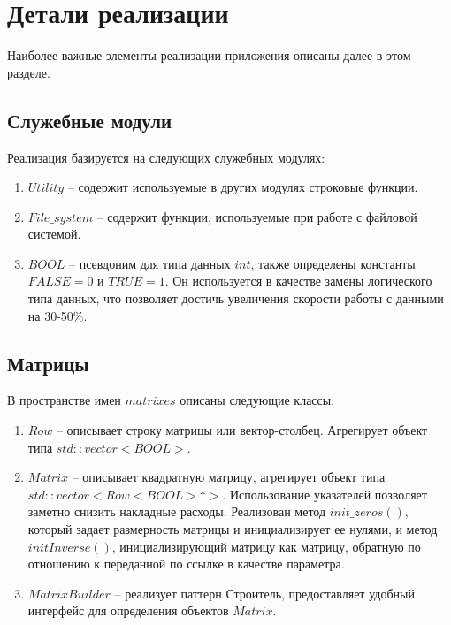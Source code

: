 
	
\section{Детали реализации} \label{ch2:sec-abbr} %
	
Наиболее важные элементы реализации приложения описаны далее в этом разделе. 	

\subsection{Служебные модули} \label{ch2:subsec-title-abbr} %

Реализация базируется на следующих служебных модулях:
\begin{enumerate}
	\item \(Utility\) -- содержит используемые в других модулях строковые функции.
	\item \(File\_system\) -- содержит функции, используемые при работе с файловой системой.
	\item \(BOOL\) -- псевдоним для типа данных \(int\), также определены константы  \(FALSE = 0\)  и  \(TRUE = 1\).  Он используется в качестве замены логического типа данных, что позволяет достичь увеличения скорости работы с данными на 30-50\%.
\end{enumerate} 

			
\subsection{Матрицы} \label{ch2:subsec-title-abbr} %

В пространстве имен \(matrixes\) описаны следующие классы:
\begin{enumerate}
	\item \(Row\) -- описывает строку матрицы или вектор-столбец. Агрегирует объект типа \(std::vector<BOOL>\).
	\item \(Matrix\) -- описывает квадратную матрицу, агрегирует объект типа \(std::vector<Row<BOOL> *>\). Использование указателей позволяет заметно снизить накладные расходы. Реализован метод \(init\_zeros()\), который задает размерность матрицы и инициализирует ее нулями, и метод \(initInverse()\), инициализирующий матрицу как матрицу, обратную по отношению к переданной по ссылке в качестве параметра.
	\item \(MatrixBuilder\) -- реализует паттерн Строитель, предоставляет удобный интерфейс для определения объектов \(Matrix\).
\end{enumerate} 


